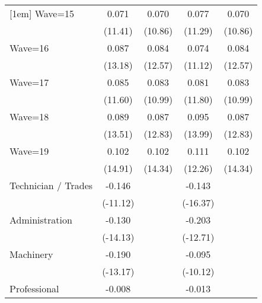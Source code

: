 {\begin{tabular}{l*{4}{c}}
[1em]
Wave=15             &       0.071\sym{***}&       0.070\sym{***}&       0.077\sym{***}&       0.070\sym{***}\\
                    &     (11.41)         &     (10.86)         &     (11.29)         &     (10.86)         \\
[1em]
Wave=16             &       0.087\sym{***}&       0.084\sym{***}&       0.074\sym{***}&       0.084\sym{***}\\
                    &     (13.18)         &     (12.57)         &     (11.12)         &     (12.57)         \\
[1em]
Wave=17             &       0.085\sym{***}&       0.083\sym{***}&       0.081\sym{***}&       0.083\sym{***}\\
                    &     (11.60)         &     (10.99)         &     (11.80)         &     (10.99)         \\
[1em]
Wave=18             &       0.089\sym{***}&       0.087\sym{***}&       0.095\sym{***}&       0.087\sym{***}\\
                    &     (13.51)         &     (12.83)         &     (13.99)         &     (12.83)         \\
[1em]
Wave=19             &       0.102\sym{***}&       0.102\sym{***}&       0.111\sym{***}&       0.102\sym{***}\\
                    &     (14.91)         &     (14.34)         &     (12.26)         &     (14.34)         \\
[1em]
Technician / Trades &      -0.146\sym{***}&                     &      -0.143\sym{***}&                     \\
                    &    (-11.12)         &                     &    (-16.37)         &                     \\
[1em]
Administration      &      -0.130\sym{***}&                     &      -0.203\sym{***}&                     \\
                    &    (-14.13)         &                     &    (-12.71)         &                     \\
[1em]
Machinery           &      -0.190\sym{***}&                     &      -0.095\sym{***}&                     \\
                    &    (-13.17)         &                     &    (-10.12)         &                     \\
[1em]
Professional        &      -0.008         &                     &      -0.013         &                     \\

\end{tabular}}
